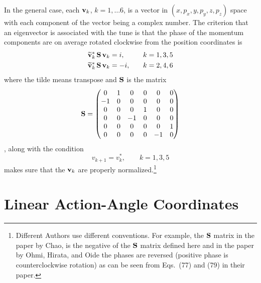 In the general case, each ${\bf v}_k$, $k = 1, \ldots 6$, is a vector in $(x, p_x, y, p_y, z, p_z)$
space with each component of the vector being a complex number. The criterion that an eigenvector
is associated with the tune is that the phase of the momentum components are on average rotated
clockwise from the position coordinates is
\begin{alignat}{2}
  \widetilde{{\bf v}}_{k}^* \, {\bf S} \, {\bf v}_k &=  i, \quad &&k = 1, 3, 5 \nonumber \\
  \widetilde{{\bf v}}_{k}^* \, {\bf S} \, {\bf v}_k &= -i, \quad &&k = 2, 4, 6
  \label{vsvi0}
\end{alignat}
where the tilde means transpose and ${\bf S}$ is the matrix
\begin{equation}
  {\bf S} = \begin{pmatrix}
      0 &  1 &  0 &  0 &  0 &  0 \\
     -1 &  0 &  0 &  0 &  0 &  0 \\
      0 &  0 &  0 &  1 &  0 &  0 \\
      0 &  0 & -1 &  0 &  0 &  0 \\
      0 &  0 &  0 &  0 &  0 &  1 \\
      0 &  0 &  0 &  0 & -1 &  0 \\
  \end{pmatrix}
  \label{s010000}
\end{equation}
, along with the condition 
\begin{equation}
  v_{k+1} = v_k^*, \qquad k = 1, 3, 5
  \label{vv135}
\end{equation}
makes sure that the ${\bf v}_k$ are properly normalized.\footnote
  {
Different Authors use different conventions. For example, the ${\bf S}$ matrix in the paper by
Chao\cite{b:chao.spin}, is the negative of the ${\bf S}$ matrix defined here and in the paper by Ohmi,
Hirata, and Oide \cite{b:ohmi} the phases are reversed (positive phase is counterclockwise rotation)
as can be seen from Eqs.~(77) and (79) in their paper.
  }

\section{Linear Action-Angle Coordinates}
\label{s:action.ang}

